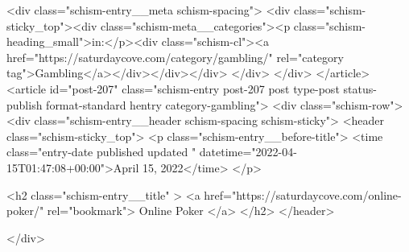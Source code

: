 {		<div class="schism-entry__meta schism-spacing">			<div class="schism-sticky_top"><div class="schism-meta__categories"><p class="schism-heading_small">in:</p><div class="schism-cl"><a href="https://saturdaycove.com/category/gambling/" rel="category tag">Gambling</a></div></div></div>		</div>
	</div>
</article>
<article id="post-207" class="schism-entry post-207 post type-post status-publish format-standard hentry category-gambling">
	<div class="schism-row">		<div class="schism-entry__header schism-spacing schism-sticky">			<header class="schism-sticky_top">				<p class="schism-entry__before-title">
					<time class="entry-date published updated " datetime="2022-04-15T01:47:08+00:00">April 15, 2022</time>				</p>

				<h2 class="schism-entry__title" >
					<a href="https://saturdaycove.com/online-poker/" rel="bookmark">
						Online Poker					</a>
				</h2>
			</header>

					</div>

}
